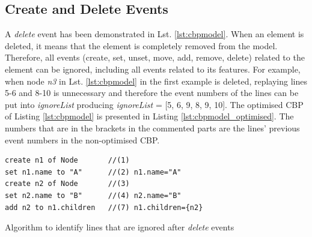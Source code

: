 \documentclass{llncs}
\begin{document}
\subsection{Create and Delete Events}
\label{subsec:create_and_delete_operations}
A \emph{delete} event has been demonstrated in Lst. \ref{lst:cbpmodel}. When an element is deleted, it means that the element is completely removed from the model. Therefore, all events (create, set, unset, move, add, remove, delete) related to the element can be ignored, including all events related to its features. For example, when node \emph{n3} in Lst. \ref{lst:cbpmodel}  in the first example is deleted, replaying lines 5-6 and 8-10 is unnecessary and therefore the event numbers of the lines can be put into \emph{ignoreList} producing \emph{ignoreList} = [5, 6, 9, 8, 9, 10]. The optimised CBP of Listing \ref{lst:cbpmodel} is presented in Listing \ref{lst:cbpmodel_optimised}. The numbers that are in the brackets in the commented parts are the lines' previous event numbers in the non-optimised CBP.  

\begin{lstlisting}[style=eol,caption={Change-based representation of the model of Figure \ref{fig:initial_model} after removal of node \emph{n5}.},label=lst:cbpmodel_optimised]
create n1 of Node       //(1)
set n1.name to "A"      //(2) n1.name="A"
create n2 of Node       //(3)
set n2.name to "B"      //(4) n2.name="B"
add n2 to n1.children   //(7) n1.children={n2}
\end{lstlisting}

\begin{algorithm}[H]
\begin{small}
\end{small}
\caption{Algorithm to identify lines that are ignored after \emph{delete} events}
\label{alg:create_delete_optimisation}
\end{algorithm}
\end{document}
